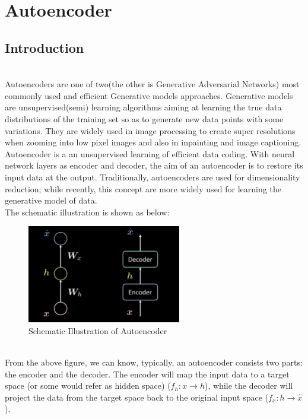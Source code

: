 \chapter{ Autoencoder }
\section{ Introduction }
\\
Autoencoders are one of two(the other is Generative Adversarial Networks) most commonly used and efficient Generative models approaches. Generative models are unsupervised(semi) learning algorithms aiming at learning the true data distributions of the training set so as to generate new data points with some variations. They are widely used in image processing to create super resolutions when zooming into low pixel images and also in inpainting and image captioning.
\\
Autoencoder is a an unsupervised learning of efficient data coding. With neural network layers as encoder and decoder, the aim of an autoencoder is to restore its input data at the output. Traditionally, autoencoders are used for dimensionality reduction; while recently, this concept are more widely used for learning the generative model of data.
\\
The schematic illustration is shown as below:
\\
\begin{figure}[htb]
    \centering
    \includegraphics[width=0.6\textwidth]{labs/09/images/Schematic_Illustration_of_Autoencoder.png}
    \caption{Schematic Illustration of Autoencoder}
    \label{fig:Schematic_Illustration_of_Autoencoder}
\end{figure}
\\
From the above figure, we can know, typically, an autoencoder consists two parts: the encoder and the decoder. The encoder will map the input data to a target space (or some would refer as hidden space) ($f_h: x\rightarrow h$), while the decoder will project the data from the target space back to the original input space ($f_x: h\rightarrow \hat{x}$).
